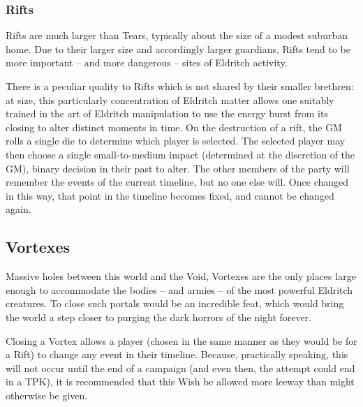 \documentclass[./././main.tex]{subfiles}
\begin{document}
\subsubsection{Rifts}
Rifts are much larger than Tears, typically about the size of a modest suburban home. Due to their larger size and accordingly larger guardians, Rifts tend to be more important -- and more dangerous -- sites of Eldritch activity.

There is a peculiar quality to Rifts which is not shared by their smaller brethren: at size, this particularly concentration of Eldritch matter allows one suitably trained in the art of Eldritch manipulation to use the energy burst from its closing to alter distinct moments in time.
On the destruction of a rift, the GM rolls a single die to determine which player is selected. The selected player may then choose a single small-to-medium impact (determined at the discretion of the GM), binary decision in their past to alter. The other members of the party will remember the events of the current timeline, but no one else will. Once changed in this way, that point in the timeline becomes fixed, and cannot be changed again.
\subsection{Vortexes}
Massive holes between this world and the Void, Vortexes are the only places large enough to accommodate the bodies -- and armies -- of the most powerful Eldritch creatures. To close such portals would be an incredible feat, which would bring the world a step closer to purging the dark horrors of the night forever. 

Closing a Vortex allows a player (chosen in the same manner as they would be for a Rift) to change any event in their timeline. Because, practically speaking, this will not occur until the end of a campaign (and even then, the attempt could end in a TPK), it is recommended that this Wish be allowed more leeway than might otherwise be given.
\end{document}
